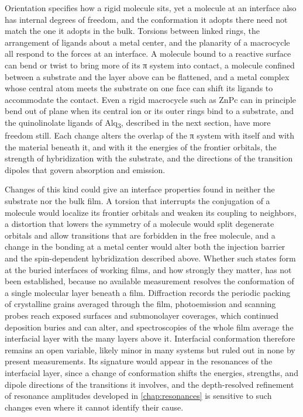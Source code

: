 Orientation specifies how a rigid molecule sits, yet a molecule at an interface also has internal degrees of freedom, and the conformation it adopts there need not match the one it adopts in the bulk. Torsions between linked rings, the arrangement of ligands about a metal center, and the planarity of a macrocycle all respond to the forces at an interface. A molecule bound to a reactive surface can bend or twist to bring more of its π system into contact, a molecule confined between a substrate and the layer above can be flattened, and a metal complex whose central atom meets the substrate on one face can shift its ligands to accommodate the contact. Even a rigid macrocycle such as ZnPc can in principle bend out of plane when its central ion or its outer rings bind to a substrate, and the quinolinolate ligands of Alq\textsubscript{3}, described in the next section, have more freedom still. Each change alters the overlap of the π system with itself and with the material beneath it, and with it the energies of the frontier orbitals, the strength of hybridization with the substrate, and the directions of the transition dipoles that govern absorption and emission.

Changes of this kind could give an interface properties found in neither the substrate nor the bulk film. A torsion that interrupts the conjugation of a molecule would localize its frontier orbitals and weaken its coupling to neighbors, a distortion that lowers the symmetry of a molecule would split degenerate orbitals and allow transitions that are forbidden in the free molecule, and a change in the bonding at a metal center would alter both the injection barrier and the spin-dependent hybridization described above. Whether such states form at the buried interfaces of working films, and how strongly they matter, has not been established, because no available measurement resolves the conformation of a single molecular layer beneath a film. Diffraction records the periodic packing of crystalline grains averaged through the film, photoemission and scanning probes reach exposed surfaces and submonolayer coverages, which continued deposition buries and can alter, and spectroscopies of the whole film average the interfacial layer with the many layers above it. Interfacial conformation therefore remains an open variable, likely minor in many systems but ruled out in none by present measurements. Its signature would appear in the resonances of the interfacial layer, since a change of conformation shifts the energies, strengths, and dipole directions of the transitions it involves, and the depth-resolved refinement of resonance amplitudes developed in \cref{chap:resonances} is sensitive to such changes even where it cannot identify their cause.

